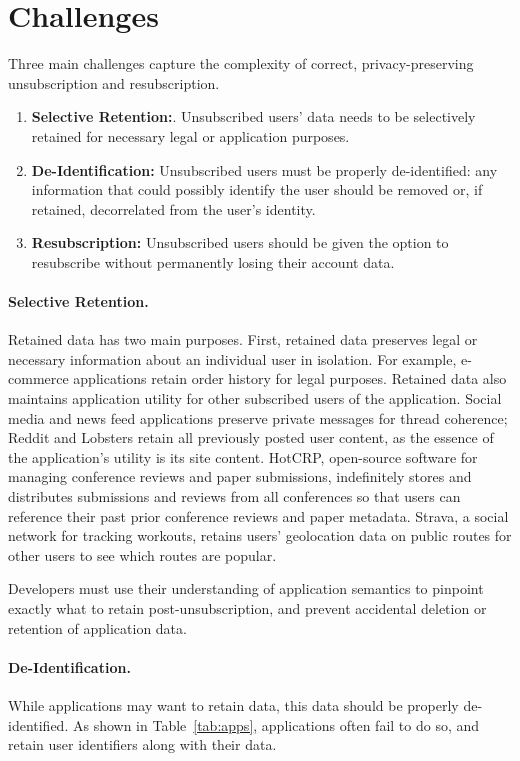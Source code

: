 \section{Challenges}
Three main challenges capture the complexity of correct, privacy-preserving unsubscription and resubscription.
\begin{enumerate}
    \item \textbf{Selective Retention:}. Unsubscribed users' data needs to be selectively retained for necessary legal or application purposes.
    \item \textbf{De-Identification:} Unsubscribed users must be properly de-identified: any
        information that could possibly identify the user should be removed or, if retained, decorrelated from the user's identity.
\item \textbf{Resubscription:} Unsubscribed users should be given the option to resubscribe without permanently losing their account
data.
\end{enumerate}

\paragraph{Selective Retention.}
Retained data has two main purposes. First, retained data preserves legal or
necessary information about an individual user in isolation. For example, e-commerce applications
retain order history for legal purposes.
Retained data also maintains application utility for other subscribed users of the
application. Social media and news feed applications preserve private messages for thread coherence; Reddit and Lobsters retain all previously posted user content, as the essence of the application's utility is its site content. 
HotCRP, open-source software for managing conference reviews and paper submissions, indefinitely stores and
distributes submissions and reviews from all conferences so that users can reference their past prior conference reviews and paper metadata. Strava, a social network
for tracking workouts, retains users' geolocation data on public routes for other users to see which
routes are popular.

Developers must use their understanding of application semantics to pinpoint exactly what 
to retain post-unsubscription, and prevent accidental deletion or retention of application
data.

\paragraph{De-Identification.}
While applications may want to retain data, this data should be properly de-identified. As shown in
Table~\ref{tab:apps}, applications often fail to do so, and retain user identifiers along with their
data. 

